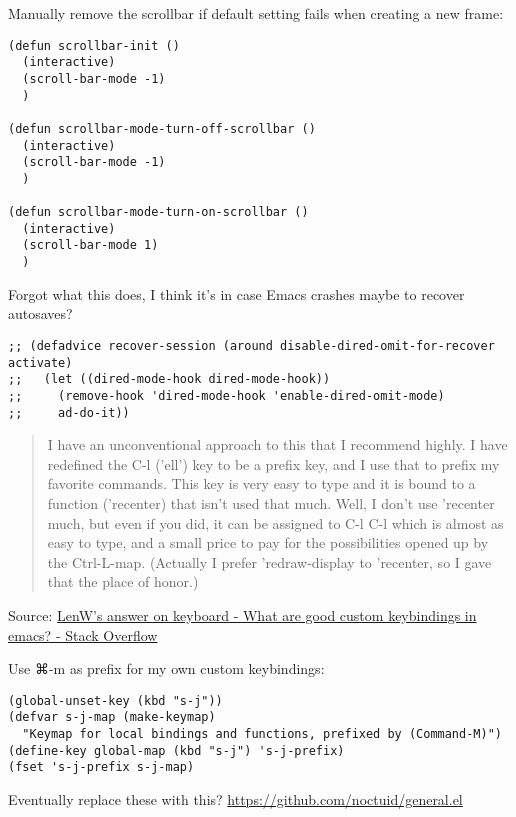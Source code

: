 \documentclass[11pt]{article}
\begin{document}
\label{sec:orgf800633}

Manually remove the scrollbar if default setting fails when creating a new frame:

\begin{verbatim}
(defun scrollbar-init ()
  (interactive)
  (scroll-bar-mode -1)
  )

(defun scrollbar-mode-turn-off-scrollbar ()
  (interactive)
  (scroll-bar-mode -1)
  )

(defun scrollbar-mode-turn-on-scrollbar ()
  (interactive)
  (scroll-bar-mode 1)
  )
\end{verbatim}

\label{sec:orgd03f44f}
Forgot what this does, I think it's in case Emacs crashes maybe to recover
autosaves?
\begin{verbatim}
;; (defadvice recover-session (around disable-dired-omit-for-recover activate)
;;   (let ((dired-mode-hook dired-mode-hook))
;;     (remove-hook 'dired-mode-hook 'enable-dired-omit-mode)
;;     ad-do-it))
\end{verbatim}
\label{sec:orgb38eb09}

\begin{quote}
I have an unconventional approach to this that I recommend highly. I have redefined the C-l ('ell') key to be a prefix key, and I use that to prefix my favorite commands. This key is very easy to type and it is bound to a function ('recenter) that isn't used that much. Well, I don't use 'recenter much, but even if you did, it can be assigned to C-l C-l which is almost as easy to type, and a small price to pay for the possibilities opened up by the Ctrl-L-map. (Actually I prefer 'redraw-display to 'recenter, so I gave that the place of honor.)
\end{quote}
Source: \href{http://stackoverflow.com/questions/5682631/what-are-good-custom-keybindings-in-emacs/5682737\#5682737}{ LenW's answer on keyboard - What are good custom keybindings in emacs? - Stack Overflow}

Use ⌘-m as prefix for my own custom keybindings:
\begin{verbatim}
(global-unset-key (kbd "s-j"))
(defvar s-j-map (make-keymap)
  "Keymap for local bindings and functions, prefixed by (Command-M)")
(define-key global-map (kbd "s-j") 's-j-prefix)
(fset 's-j-prefix s-j-map)
\end{verbatim}
\label{sec:org580856d}
Eventually replace these with this? \url{https://github.com/noctuid/general.el}
\label{sec:org003e1af}
\end{document}
